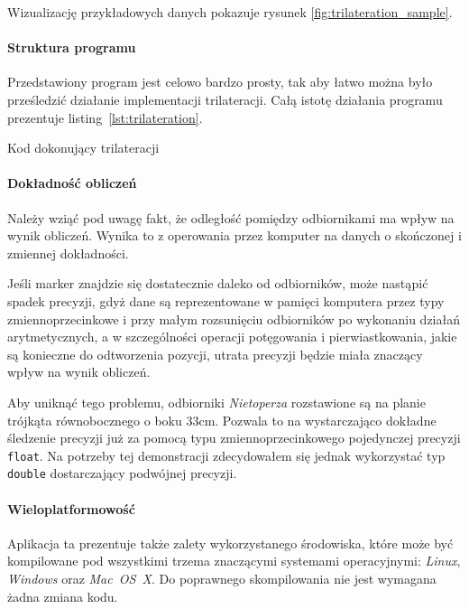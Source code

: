 Wizualizację przykładowych danych pokazuje rysunek \ref{fig:trilateration_sample}.

\paragraph{Struktura programu}
Przedstawiony program jest celowo bardzo prosty, tak aby łatwo można było prześledzić działanie implementacji trilateracji. Całą istotę działania programu prezentuje listing~\ref{lst:trilateration}.

\begin{listing}
  
  \caption{Kod dokonujący trilateracji}
  \label{lst:trilateration}
\end{listing}

\paragraph{Dokładność obliczeń}
Należy wziąć pod uwagę fakt, że odległość pomiędzy odbiornikami ma wpływ na wynik obliczeń. Wynika to z operowania przez komputer na danych o skończonej i zmiennej dokładności.

Jeśli marker znajdzie się dostatecznie daleko od odbiorników, może nastąpić spadek precyzji, gdyż dane są reprezentowane w pamięci komputera przez typy zmiennoprzecinkowe i przy małym rozsunięciu odbiorników po wykonaniu działań arytmetycznych, a w szczególności operacji potęgowania i pierwiastkowania, jakie są konieczne do odtworzenia pozycji, utrata precyzji będzie miała znaczący wpływ na wynik obliczeń.

Aby uniknąć tego problemu, odbiorniki \textsl{Nietoperza} rozstawione są na planie trójkąta równobocznego o boku 33cm. Pozwala to na wystarczająco dokładne śledzenie precyzji już za pomocą typu zmiennoprzecinkowego pojedynczej precyzji \verb|float|. Na potrzeby tej demonstracji zdecydowałem się jednak wykorzystać typ \verb|double| dostarczający podwójnej precyzji.

\paragraph{Wieloplatformowość}
Aplikacja ta prezentuje także zalety wykorzystanego środowiska, które może być kompilowane pod wszystkimi trzema znaczącymi systemami operacyjnymi: \textsl{Linux}, \textsl{Windows} oraz \textsl{Mac~OS~X}. Do poprawnego skompilowania nie jest wymagana żadna zmiana kodu.

